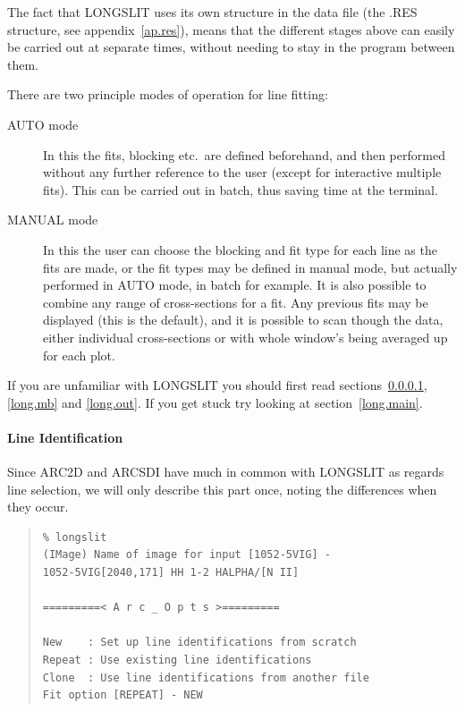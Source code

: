 The fact that LONGSLIT uses its own structure in the data file (the
.RES structure, see appendix~\ref{ap.res}), means that the different
stages above can easily be carried out at separate times, without
needing to stay in the program between them.

There are two principle modes of operation for line fitting:

\begin{description}

\item[AUTO mode] In this the fits, blocking etc.\ are defined
beforehand, and then performed without any further reference to the
user (except for interactive multiple fits).
This can be carried out in batch, thus saving time at the terminal.

\item[MANUAL mode] In this the user can choose the blocking and fit
type for each line as the fits are made, or the fit types may be
defined in manual mode, but actually performed in AUTO mode, in batch
for example.
It is also possible to combine any range of cross-sections for a fit.
Any previous fits may be displayed (this is the default), and it is
possible to scan though the data, either individual cross-sections or
with whole window's being averaged up for each plot.

\end{description}

If you are unfamiliar with LONGSLIT you should first read
sections~\ref{long.id}, \ref{long.mb} and \ref{long.out}.
If you get stuck try looking at section~\ref{long.main}.

\paragraph{Line Identification}
\label{long.id}

Since ARC2D and ARCSDI have much in common with LONGSLIT as regards
line selection, we will only describe this part once, noting the
differences when they occur.

\begin{quote}\begin{verbatim}
% longslit
(IMage) Name of image for input [1052-5VIG] -
1052-5VIG[2040,171] HH 1-2 HALPHA/[N II]

=========< A r c _ O p t s >=========
 
New    : Set up line identifications from scratch
Repeat : Use existing line identifications
Clone  : Use line identifications from another file
Fit option [REPEAT] - NEW
\end{verbatim}\end{quote}

